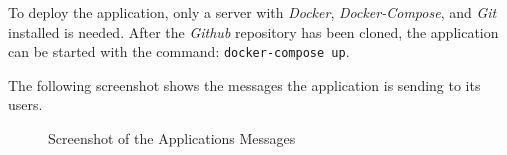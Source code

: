 To deploy the application, only a server with \emph{Docker}, \emph{Docker-Compose}, and \emph{Git} installed is needed. After the \emph{Github} repository has been cloned, the application can be started with the command:  \lstinline{docker-compose up}.

The following screenshot shows the messages the application is sending to its users.

\begin{figure}[H]
    \centering
    \captionsetup{justification=centering}
    \caption{Screenshot of the Applications Messages}
    \label{fig:screenshot-telegram}
\end{figure}